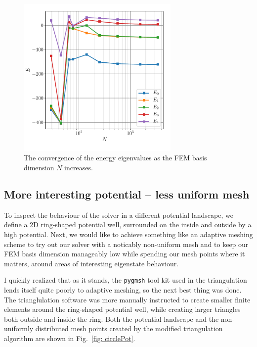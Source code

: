 \documentclass[a4paper,12pt]{article}
\begin{document}
\begin{figure}[H]
\centering
\includegraphics[width=0.7\textwidth]{../figs/energy_convergence.pdf}
\caption{The convergence of the energy eigenvalues as the FEM basis dimension $N$ increases.}
\label{fig: gaussEigVals}
\end{figure}

\subsection{More interesting potential -- less uniform mesh}

To inspect the behaviour of the solver in a different potential landscape, we define a 2D ring-shaped potential well, surrounded on the inside and outside by a high potential. Next, we would like to achieve something like an adaptive meshing scheme to try out our solver with a noticably non-uniform mesh and to keep our FEM basis dimension manageably low while spending our mesh points where it matters, around areas of interesting eigenstate behaviour.

I quickly realized that as it stands, the \texttt{pygmsh} tool kit used in the triangulation lends itself quite poorly to adaptive meshing, so the next best thing was done. The trianglulation software was more manually instructed to create smaller finite elements around the ring-shaped potential well, while creating larger triangles both outside and inside the ring. Both the potential landscape and the non-uniformly distributed mesh points created by the modified triangulation algorithm are shown in Fig.~\ref{fig: circlePot}.
\end{document}
